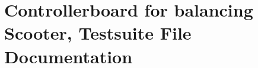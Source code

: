 \documentclass[a4paper]{book}
\begin{document}
\chapter{Controllerboard for balancing Scooter, Testsuite File Documentation}





























\printindex
\end{document}
